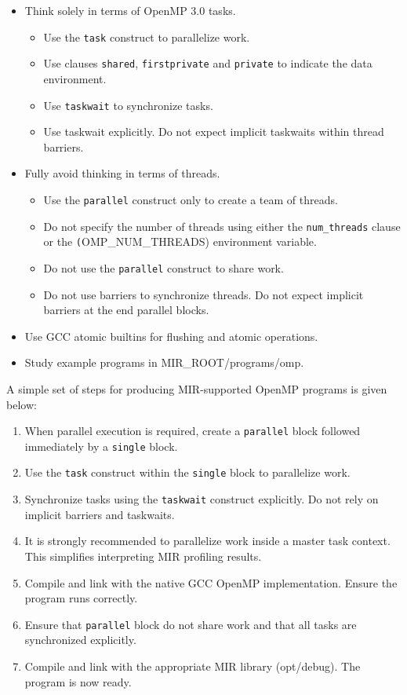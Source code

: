 \documentclass[11pt,a4paper]{article}
\begin{document}
\begin{itemize}
    \item Think solely in terms of OpenMP 3.0 tasks.
    \begin{itemize}
        \item Use the \texttt{task} construct to parallelize work.
        \item Use clauses \texttt{shared}, \texttt{firstprivate} and \texttt{private} to indicate the data environment.
        \item Use \texttt{taskwait} to synchronize tasks.
        \item Use taskwait explicitly. Do not expect implicit taskwaits within thread barriers.
    \end{itemize}
    \item Fully avoid thinking in terms of threads.
    \begin{itemize}
        \item Use the \texttt{parallel} construct only to create a team of threads.
        \item Do not specify the number of threads using either the \texttt{num\_threads} clause or the \texttt(OMP\_NUM\_THREADS) environment variable.
        \item Do not use the \texttt{parallel} construct to share work.
        \item Do not use barriers to synchronize threads. Do not expect implicit barriers at the end parallel blocks.
    \end{itemize}
    \item Use GCC atomic builtins for flushing and atomic operations.
    \item Study example programs in MIR\_ROOT/programs/omp.
\end{itemize}

A simple set of steps for producing MIR-supported OpenMP programs is given below:

\begin{enumerate}
\item When parallel execution is required, create a \texttt{parallel}  block followed immediately by a \texttt{single} block.
\item Use the \texttt{task} construct within the \texttt{single} block to parallelize work.
\item Synchronize tasks using the \texttt{taskwait} construct explicitly. Do not rely on implicit barriers and taskwaits.
\item It is strongly recommended to parallelize work inside a master task context. This simplifies interpreting MIR profiling results.
\item Compile and link with the native GCC OpenMP implementation. Ensure the program runs correctly.
\item Ensure that \texttt{parallel} block do not share work and that all tasks are synchronized explicitly.
\item Compile and link with the appropriate MIR library (opt/debug). The program is now ready.
\end{enumerate}
\end{document}
